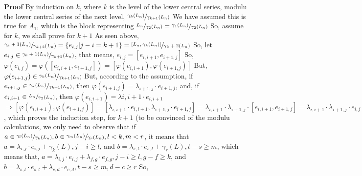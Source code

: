 \documentclass[12pt]{article}
\begin{document}
\textbf{Proof} \newline
By induction on $k$, where $k$ is the level of the lower central series, modulu the lower central series of the next level, $\sfrac{\gamma_k(L_n)}{\gamma_{k+1}(L_n)}$ \newline
We have assumed this is true for $A_1$, which is the block representing $\sfrac{L_n}{\gamma_2(L_n)}=\sfrac{\gamma_1(L_n)}{\gamma_2(L_n)}$ \newline
So, assume for $k$, we shall prove for $k+1$ \newline
As seen above, $\sfrac{\gamma_k+1(L_n)}{\gamma_{k+2}(L_n)}=\{e_{i,j} | j-i=k+1\}=\sfrac{[L_n,\gamma_{k}(L_n)]}{\gamma_k+2(L_n)}$ \newline
So, let $e_{i,j} \in \sfrac{\gamma_k+1(L_n)}{\gamma_{k+2}(L_n)}$, that means, $e_{i,j}=[e_{i,i+1},e_{i+1,j}]$ \newline
So, $\varphi(e_{i,j})=\varphi([e_{i,i+1},e_{i+1,j}])=[\varphi(e_{i,i+1}),\varphi(e_{i+1,j})]$ \newline
But, $\varphi(e_{i+1,j}) \in \sfrac{\gamma_k(L_n)}{\gamma_{k+1}(L_n)}$ \newline
But, according to the assumption, if $e_{i+1,j} \in  \sfrac{\gamma_k(L_n)}{\gamma_{k+1}(L_n)}$, then $\varphi(e_{i+1,j})=\lambda_{i+1,j} \cdot e_{i+1,j}$, and, if $e_{i,i+1} \in \sfrac{L_n}{\gamma_2(L_n)}$, then $\varphi(e_{i,i+1})=\lambda{i,i+1} \cdot e_{i,i+1}$ \newline
$\Rightarrow [\varphi(e_{i,i+1}),\varphi(e_{i+1,j})]=[\lambda_{i,i+1} \cdot e_{i,i+1},\lambda_{i+1,j} \cdot e_{i+1,j}]=\lambda_{i,i+1} \cdot \lambda_{i+1,j} \cdot [e_{i,i+1},e_{i+1,j}]=\lambda_{i,i+1} \cdot \lambda_{i+1,j} \cdot e_{i,j}$, which proves the induction step, for $k+1$ \newline
(to be convinced of the modulu calculations, we only need to observe that if $a \in \sfrac{\gamma_l(L_n)}{\gamma_k(L_n)},b \in \sfrac{\gamma_m(L_n)}{\gamma_r(L_n)},l<k,m<r$, it means that \newline
$a=\lambda_{i,j} \cdot e_{i,j}+\gamma_k(L),j-i \geq l$, and \newline
$b=\lambda_{s,t} \cdot e_{s,t}+\gamma_r(L),t-s \geq m$, \newline 
which means that, \newline
$a=\lambda_{i,j} \cdot e_{i,j}+\lambda_{f,g} \cdot e_{f,g},j-i \geq l,g-f \geq k$, and \newline
$b=\lambda_{s,t} \cdot e_{s,t}+\lambda_{c,d} \cdot e_{c,d},t-s \geq m,d-c \geq r$ \newline
So, \newline
\end{document}
